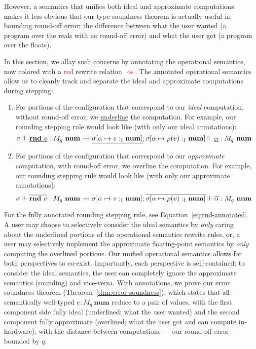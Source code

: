 However, a semantics that unifies both ideal and approximate computations makes
it less obvious that our type soundness theorem is actually useful in bounding
round-off error: the difference between what the user wanted (a program over the
reals with no round-off error) and what the user got (a program over the
floats).

In this section, we allay such concerns by annotating the operational semantics,
now colored with a \textcolor{red}{red} rewrite relation
\textcolor{red}{$\rightsquigarrow$}. The annotated operational semantics allow
us to cleanly track and separate the ideal and approximate computations during
stepping:
\begin{enumerate}
  \item For portions of the configuration that correspond to our \textit{ideal}
    computation, without round-off error, we \underline{underline} the
    computation. For example, our rounding stepping rule would look like (with
    only our ideal annotations):
    \begin{equation*}
      \sigma \Vdash \underline{\mathbf{rnd} \ v} : M_q \ \mathbf{num} \ \textcolor{red}{\rightsquigarrow} \
      \underline{\sigma [\alpha \mapsto v :_1 \mathbf{num}]}; \sigma [\alpha \mapsto \rho(v) :_1
      \mathbf{num}] \Vdash \underline{\alpha} : M_q \ \mathbf{num}
    \end{equation*}
  \item For portions of the configuration that correspond to our
    \textit{approximate} computation, with round-off error, we
    $\overline{\text{overline}}$ the computation. For example, our rounding
    stepping rule would look like (with only our approximate annotations):
    \begin{equation*}
      \sigma \Vdash \overline{\mathbf{rnd} \ v} : M_q \ \mathbf{num} \ \textcolor{red}{\rightsquigarrow} \ \sigma
      [\alpha \mapsto v :_1 \mathbf{num}]; \overline{\sigma [\alpha \mapsto \rho(v) :_1
      \mathbf{num}]} \Vdash \overline{\alpha} : M_q \ \mathbf{num}
    \end{equation*}
\end{enumerate}
For the fully annotated rounding stepping rule, see
Equation~\ref{eq:rnd-annotated}.
A user may choose to selectively consider the ideal semantics by \textit{only}
caring about the underlined portions of the operational semantics rewrite rules,
or, a user may selectively implement the approximate floating-point semantics by
\textit{only} computing the overlined portions. Our unified operational
semantics allows for both perspectives to co-exist.
Importantly, each perspective is self-contained: to consider the ideal
semantics, the user can completely ignore the approximate semantics (rounding)
and vice-versa.
With annotations, we prove our error soundness theorem
(Theorem~\ref{thm:error-soundness}), which states that all semantically
well-typed $e : M_q \ \mathbf{num}$ reduce to a pair of values, with the first
component side fully ideal (underlined; what the user wanted) and the second component fully
approximate (overlined; what the user got and can compute in-hardware), with the distance
between computations --- our round-off error --- bounded by $q$.

